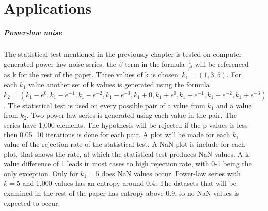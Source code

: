 \chapter{Applications}
\paragraph{Power-law noise}
The statistical test mentioned in the previously chapter is tested on computer generated power-law noise series.\cite{Timmer1995} the $\beta$ term in the formula $\frac{1}{f^{\beta}}$ will be referenced as k for the rest of the paper. Three values of k is chosen: $k_1=(1,3,5)$. For each $k_1$ value another set of k values is generated using the formula $k_2=(k_1-e^0,k_1-e^{-1},k_1-e^{-2},k_1-e^{-3},k_1+0,k_1+e^0,k_1+e^{-1},k_1+e^{-2},k_1+e^{-3})$. The statistical test is used on every possible pair of a value from $k_1$ and a value from $k_2$. Two power-law series is generated using each value in the pair. The series have 1,000 elements. The hypothesis will be rejected if the p values is less then 0.05. 10 iterations is done for each pair. A plot will be made for each $k_1$ value of the rejection rate of the statistical test. A NaN plot is include for each plot, that shows the rate, at which the statistical test produces NaN values. A k value difference of 1 leads in most cases to high rejection rate, with 0-1 being the only exception. Only for $k_1=5$ does NaN values occur. Power-law series with $k=5$ and 1,000 values has an entropy around 0.4. The datasets that will be examined in the rest of the paper has entropy above 0.9, so no NaN values is expected to occur.

